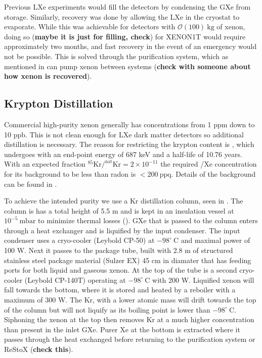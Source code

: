 Previous LXe experiments would fill the detectors by condensing the GXe from storage.  Similarly, recovery was done by allowing the LXe
in the cryostat to evaporate.  While this was achievable for detectors with $\mathcal{O}(100)\ \mathrm{kg}$ of xenon, doing so
(\textbf{maybe it is just for filling, check}) for XENON1T would require approximately two months, and fast recovery in the event of an
emergency would not be possible.  This is solved through the purification system, which as mentioned in  can
pump xenon between systems (\textbf{check with someone about how xenon is recovered}).



\subsection{Krypton Distillation}
\label{subsec:xenon1t_kr_dist}
Commercial high-purity xenon generally has  concentrations from 1 ppm down to 10 ppb.  This is not clean enough for LXe dark matter
detectors so additional distillation is necessary.  The reason for restricting the
krypton content is , which undergoes \betadecay with an end-point energy of 687 keV and a half-life of 10.76 years.  With
an expected fraction $\mathrm{^{85}Kr / ^{nat}Kr = 2 \times 10^{-11}}$ the required /Xe concentration for its background to be
less than radon is $< 200\ \mathrm{ppq}$.  Details of the  background can be found in .

To achieve the intended purity we use a Kr distillation column, seen in .  The column is has a total
height of 5.5 m and is kept in an insulation vessel at $10^{-5}\ \mathrm{mbar}$ to minimize thermal losses ().  GXe
that is passed to the column enters through a heat exchanger and is
liquified by the input condenser.  The input condenser uses a cryo-cooler (Leybold CP-50) at $-98^{\circ}\ \mathrm{C}$ and maximal power
of 100 W.  Next it passes to the package tube, built with 2.8 m of structured stainless steel package material (Sulzer EX) 45 cm in
diamater that has feeding ports for both liquid and gaseous xenon.  At the top of the tube is a second cryo-cooler (Leybold CP-140T)
operating at $-98^{\circ}\ \mathrm{C}$ with 200 W.  Liquified xenon will fall towards the bottom, where it is stored and heated by a
reboiler with a maximum of 300 W.  The Kr, with a lower atomic mass will drift towards the top of the column but will not liquify as its
boiling point is lower than $-98^{\circ}\ \mathrm{C}$.  Siphoning the xenon at the top then removes Kr at a much higher concentration than
present in the inlet GXe.  Purer Xe at the bottom is extracted where it passes through the heat exchanged before returning to the
purification system or ReStoX (\textbf{check this}).

